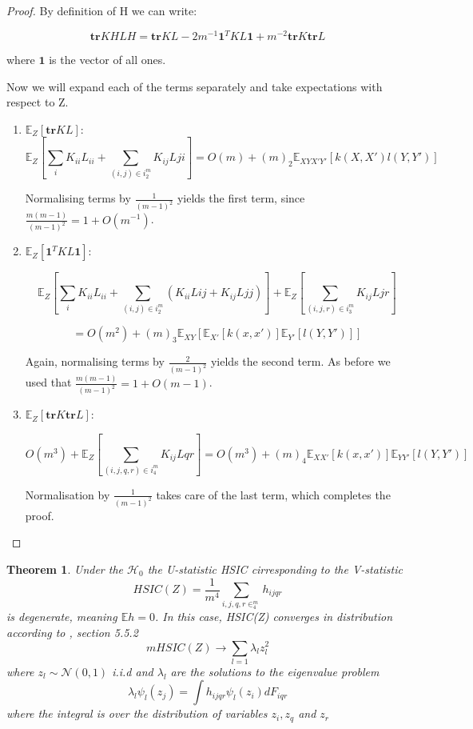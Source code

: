 \documentclass[8pt,a4paper]{article}
\theoremstyle{plain}
\newtheorem{thm}{Theorem}[section]
\theoremstyle{definition}
\theoremstyle{remark}
\begin{document}
\begin{proof}

By definition of H we can write:

$$
\textbf{tr}KHLH = \textbf{tr}KL - 2m^{-1}\mathbf{1}^{T}KL\mathbf{1} + m^{-2}\textbf{tr}K\textbf{tr}L
$$

where $\mathbf{1}$ is the vector of all ones.

Now we will expand each of the terms separately and take expectations with respect to Z.

\begin{enumerate}


\item $\mathbb{E}_{Z}[\textbf{tr}KL]$:
$$
\mathbb{E}_{Z}[\sum_{i}K_{ii}L_{ii} + \sum_{(i,j)\in i_{2}^{m}}K_{ij}L{ji}] = O(m) +(m)_{2}\mathbb{E}_{XYX'Y'}[k(X,X')l(Y,Y')]
$$

Normalising terms by $\frac{1}{(m−1)^{2}}$ yields the first term, since $\frac{m(m−1)}{(m−1)^{2}}=1+O(m^{−1})$.

\item $\mathbb{E}_{Z}[\mathbf{1}^{T}KL\mathbf{1}]$:

$$
\mathbb{E}_{Z}[\sum_{i}K_{ii}L_{ii} + \sum_{(i,j)\in i_{2}^{m}}(K_{ii}L{ij} + K_{ij}L{jj})]  + \mathbb{E}_{Z}[\sum_{(i,j,r)\in i_{3}^{m}} K_{ij}L{jr}] $$

$$= O(m^{2}) +(m)_{3}\mathbb{E}_{XY}[\mathbb{E}_{X'}[k(x,x')]\mathbb{E}_{Y'}[l(Y,Y')]]
$$

Again, normalising terms by $\frac{2}{(m−1)^{2}}$ yields the second term. As before we used that  $\frac{m(m−1)}{(m−1)^{2}}=1+O(m−1)$.

\item $\mathbb{E}_{Z}[\textbf{tr}K\textbf{tr}L]$:

$$
O(m^{3}) + \mathbb{E}_{Z}[\sum_{(i,j,q,r)\in i_{4}^{m}} K_{ij}L{qr}] = O(m^{3}) + 
(m)_{4}\mathbb{E}_{XX'}[k(x,x')]\mathbb{E}_{YY'}[l(Y,Y')]
$$

Normalisation by $\frac{1}{(m−1)^{2}}$ takes care of the last term, which completes the proof.
\end{enumerate}

\end{proof}

\begin{thm}
Under the $\mathcal{H}_{0}$ the U-statistic HSIC cirresponding to the V-statistic 
$$ HSIC(Z) = \frac{1}{m^{4}}\sum_{i,j,q,r \in_{4}^{m}} h_{ijqr}$$ 
is degenerate, meaning $\mathbb{E}h=0$. In this case, HSIC(Z) converges in distribution according to \cite{HSICDegenerate}, section 5.5.2
$$mHSIC(Z)\rightarrow \sum_{l=1} \lambda_{l}z_{l}^{2}$$
where $z_{l}\sim \mathcal{N}(0,1)$ i.i.d and $\lambda_{l}$ are the solutions to the eigenvalue problem
$$
\lambda_{l}\psi_{l}(z_{j}) = \int h_{ijqr}\psi_{l}(z_{i})dF_{iqr}
$$
where the integral is over the distribution of variables $z_{i},z_{q}$ and $z_{r}$\cite{HSICdistribution}
\end{thm}
\end{document}
